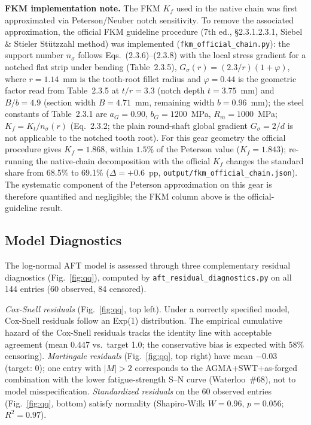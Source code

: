 \documentclass[twocolumn,12pt,a4paper]{article}
\begin{document}
\textbf{FKM implementation note.} The FKM $K_f$ used in the native
chain was first approximated via Peterson/Neuber notch sensitivity. To
remove the associated approximation, the official FKM guideline
procedure (7th ed., \S2.3.1.2.3.1, Siebel \& Stieler St\"utzzahl
method) was implemented
(\texttt{fkm\_official\_chain.py}): the support number
$n_\sigma$ follows Eqs.~(2.3.6)--(2.3.8) with the local stress
gradient for a notched flat strip under bending
(Table~2.3.5), $G_\sigma(r) = (2.3/r)(1+\varphi)$, where
$r = 1.14$~mm is the tooth-root fillet radius and
$\varphi = 0.44$ is the geometric factor read from Table~2.3.5 at
$t/r = 3.3$ (notch depth $t = 3.75$~mm) and
$B/b = 4.9$ (section width $B = 4.71$~mm, remaining width
$b = 0.96$~mm); the steel constants of Table~2.3.1 are
$a_G = 0.90$, $b_G = 1200$~MPa, $R_m = 1000$~MPa;
$K_f = K_t/n_\sigma(r)$ (Eq.~2.3.2; the plain round-shaft global
gradient $G_\sigma = 2/d$ is not applicable to the notched tooth
root).
For this gear geometry the official procedure gives
$K_f = 1.868$, within $1.5$\% of the Peterson value
($K_f = 1.843$); re-running the native-chain decomposition with the
official $K_f$ changes the standard share from 68.5\% to 69.1\%
($\Delta = +0.6$~pp, \texttt{output/fkm\_official\_chain.json}).
The systematic component of the Peterson approximation on this gear
is therefore quantified and negligible; the FKM column above is the
official-guideline result.

\subsection{Model Diagnostics}

The log-normal AFT model is assessed through three complementary
residual diagnostics (Fig.~\ref{fig:qq}), computed by
\texttt{aft\_residual\_diagnostics.py} on all 144 entries (60
observed, 84 censored).

\textit{Cox-Snell residuals} (Fig.~\ref{fig:qq}, top left). Under a
correctly specified model, Cox-Snell residuals follow an Exp(1)
distribution. The empirical cumulative hazard of the Cox-Snell
residuals tracks the identity line with acceptable agreement (mean
0.447 vs.\ target 1.0; the conservative bias is expected with 58\%
censoring). \textit{Martingale residuals} (Fig.~\ref{fig:qq}, top
right) have mean $-$0.03 (target: 0); one entry with $|M| > 2$
corresponds to the AGMA+SWT+as-forged combination with the lower
fatigue-strength S--N curve (Waterloo~\#68), not to model
misspecification. \textit{Standardized
residuals} on the 60 observed entries (Fig.~\ref{fig:qq}, bottom)
satisfy normality (Shapiro-Wilk $W=0.96$, $p=0.056$; $R^2=0.97$). %
\end{document}
